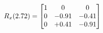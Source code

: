 \documentclass[preview]{standalone}
\begin{document}
\begin{align*}
\special{dvisvgm:raw <g id='unique000'>}R_{x}(2.72) = \begin{bmatrix}1 & 0 & 0 \\0 & -0.91 & -0.41 \\0 & +0.41 & -0.91\end{bmatrix}\special{dvisvgm:raw </g>}
\end{align*}
\end{document}
